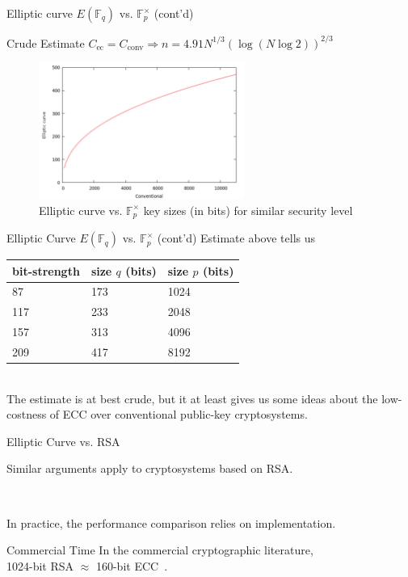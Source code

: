 \documentclass{beamer}
\begin{document}
\begin{frame}{Elliptic curve $E(\mathbb{F}_q)$ vs. $\mathbb{F}_p^{\times}$ 
(cont'd)}
\begin{block}{Crude Estimate}
$C_{\mathrm{ec}} = C_{\mathrm{conv}} \Longrightarrow 
n = 4.91 N^{1/3} (\log(N \log 2))^{2/3}$
\end{block}

\begin{figure}[htbp]
\centering
  \includegraphics[width=0.6\textwidth]{img/ec_Fp_cmp.pdf}
  \caption{Elliptic curve vs. $\mathbb{F}_p^{\times}$ key sizes (in bits)
for similar security level}
  \label{fig:ec_Fp_cmp}
\end{figure}

\end{frame}

\begin{frame}{Elliptic Curve $E(\mathbb{F}_q)$ vs. $\mathbb{F}_p^{\times}$ (cont'd)}
Estimate above tells us
~\\[.3in]
\begin{tabular}{|p{1in}|p{1in}|p{1in}|}
\hline
bit-strength & size $q$ (bits) & size $p$ (bits) \\\hline
87  & 173 & 1024\\\hline
117 & 233 & 2048 \\\hline
157 & 313 & 4096 \\\hline
209 & 417 & 8192 \\\hline
\end{tabular}
~\\[.3in]

The estimate is at best crude, but it at least gives us some ideas about the
low-costness of ECC over conventional public-key cryptosystems.

\end{frame}

\begin{frame}{Elliptic Curve vs. RSA}
\begin{block}{}
Similar arguments apply to cryptosystems based on RSA.
\end{block}
~\\[.3in]

\pause

In practice, the performance comparison relies on implementation.

\begin{block}{Commercial Time}
In the commercial cryptographic literature, \\
1024-bit RSA $\approx$ 160-bit ECC~\cite{LeVe2001}.
\end{block}

\end{frame}
\end{document}
